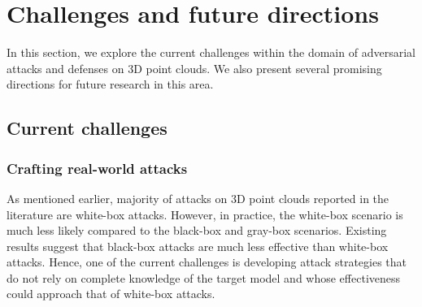 \documentclass{ieeeaccess}
\begin{document}
\section{Challenges and future directions}
\label{sec:Challenges}

In this section, we explore the current challenges within the domain of adversarial attacks and defenses on 3D point clouds. We also present several promising directions for future research in this area. %


\subsection{Current challenges}

\subsubsection{Crafting real-world attacks}
As mentioned earlier, majority of attacks on 3D point clouds reported in the literature are white-box attacks. However, in practice, the white-box scenario is much less likely compared to the black-box and gray-box scenarios. Existing results suggest that black-box attacks are much less effective than white-box attacks. Hence, one of the current challenges is developing attack strategies that do not rely on complete knowledge of the target model and whose effectiveness could approach that of white-box attacks. 

\end{document}

